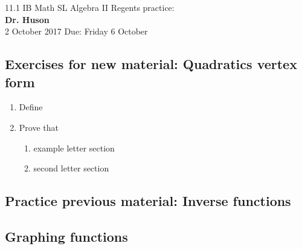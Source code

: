 \documentclass[]{book}
\begin{document}
\begin{center}
{\Large 11.1 IB Math SL Algebra II Regents practice: }\\
\textbf{Dr. Huson}\\ %
2 October 2017 Due: Friday 6 October %
\end{center}

\vspace{0.2 cm}


\subsection*{Exercises for new material: Quadratics vertex form}

\begin{enumerate}
\item
Define 

\item	Prove that 

\begin{enumerate}
	\item	example  letter section
	
	\item   second letter section
	
\end{enumerate}

\end{enumerate}

\subsection*{Practice previous material: Inverse functions}

\subsection*{Graphing functions}

\begin{enumerate}


	
\end{enumerate}
\end{document}
